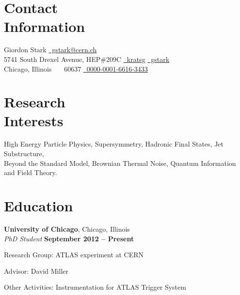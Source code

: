 \documentclass[margin,line]{resume}
\let\origsection\section%
\let\section\subsection%
\let\section\origsection%
\begin{document}
\begin{resume}

\section{\mysidestyle Contact\\Information}

Giordon Stark						\hfill \href{mailto:gstark@cern.ch}{\faEnvelope~gstark@cern.ch}
\vspace{0mm}\\\vspace{0mm}%
5741 South Drexel Avenue, HEP\#209C \hfill \href{https://github.com/kratsg}{\faGithub~kratsg} {\large\rmfamily\textbullet} \href{https://gitlab.cern.ch/gstark}{\faGitlab~gstark}
\vspace{0mm}\\\vspace{0mm}%
Chicago, Illinois \ \ \ 60637    \hfill \href{https://orcid.org/0000-0001-6616-3433}{\faKey~0000-0001-6616-3433} \\
\vspace{-4.5mm}%

\section{\mysidestyle Research\\Interests}

High Energy Particle Physics, Supersymmetry, Hadronic Final States, Jet Substructure, \\
Beyond the Standard Model, Brownian Thermal Noise, Quantum Information and Field Theory.

    \section{\mysidestyle Education}

	\textbf{University of Chicago}, Chicago, Illinois \vspace{2mm}\\\vspace{1mm}%
	\textsl{PhD Student} \hfill \textbf{September 2012 -- Present}\vspace{-3mm}\\\vspace{-1mm}%
	\begin{list2}
		\item Research Group: ATLAS experiment at CERN
		\item Advisor: David Miller
		\item Other Activities: Instrumentation for ATLAS Trigger System
	\end{list2}\vspace{-1.5mm}


\end{resume}
\end{document}
